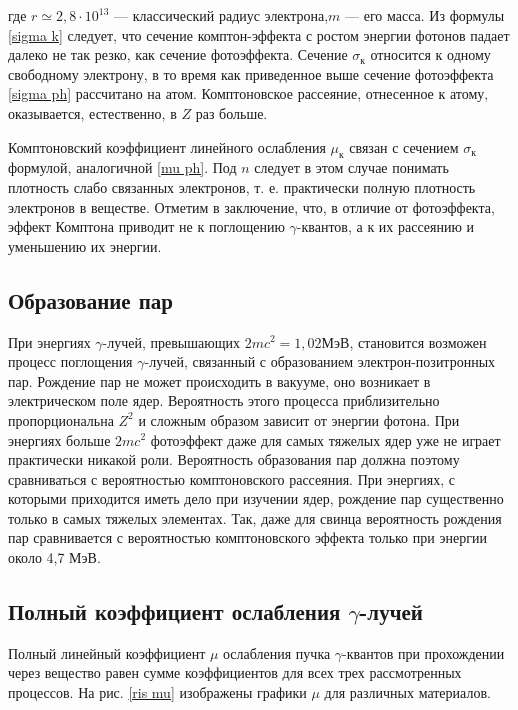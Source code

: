 \documentclass[a4paper, 12pt]{article}%
\begin{document}
	где $ r \simeq 2,8 \cdot 10^{13} $ --- классический радиус электрона,$ m $ --- его масса. Из формулы \eqref{sigma k} следует, что сечение комптон-эффекта с ростом энергии фотонов падает далеко не так резко, как сечение фотоэффекта.
	Сечение $ \sigma_{\text{к}} $ относится к одному свободному электрону, в то время как приведенное выше сечение фотоэффекта \eqref{sigma ph} рассчитано на атом.
	Комптоновское рассеяние, отнесенное к атому, оказывается, естественно, в $ Z $ раз больше. 
	
	Комптоновский коэффициент линейного ослабления $ \mu_{\text{к}} $ связан с
	сечением $ \sigma_{\text{к}} $ формулой, аналогичной \eqref{mu ph}. Под $ n $ следует в этом случае понимать плотность слабо связанных электронов, т. е. практически полную плотность электронов в веществе.
	Отметим в заключение, что, в отличие от фотоэффекта, эффект
	Комптона приводит не к поглощению $\gamma$-квантов, а к их рассеянию и
	уменьшению их энергии.
	
	\subsection*{Образование пар}
	
	 При энергиях $\gamma$-лучей, превышающих $ 2mc^2 = 1,02  $МэВ, становится возможен процесс поглощения $\gamma$-лучей, связанный с образованием электрон-позитронных пар. Рождение пар не
	может происходить в вакууме, оно возникает в электрическом поле
	ядер. Вероятность этого процесса приблизительно пропорциональна
	$ Z^2  $ и сложным образом зависит от энергии фотона. При энергиях больше $ 2mc^2  $ фотоэффект даже для самых тяжелых ядер уже не играет
	практически никакой роли. Вероятность образования пар должна поэтому сравниваться с вероятностью комптоновского рассеяния. При
	энергиях, с которыми приходится иметь дело при изучении ядер, рождение пар существенно только в самых тяжелых элементах. Так, даже
	для свинца вероятность рождения пар сравнивается с вероятностью
	комптоновского эффекта только при энергии около 4,7 МэВ.
	\subsection*{Полный коэффициент ослабления $\gamma$-лучей}
	
	Полный линейный коэффициент $ \mu $ ослабления пучка $\gamma$-квантов при прохождении через вещество равен сумме коэффициентов для всех трех рассмотренных процессов. На рис. \ref{ris mu} изображены графики $ \mu $ для различных материалов.
	
\end{document}
